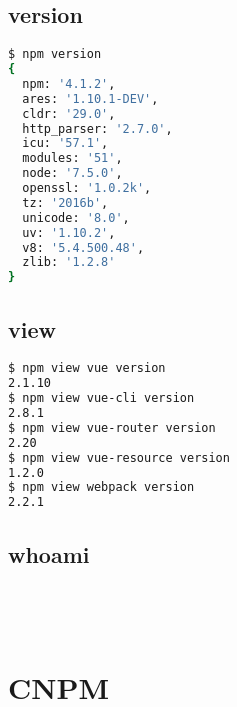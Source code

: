 \subsection{version}

\begin{lstlisting}[language=bash]
$ npm version
{
  npm: '4.1.2',
  ares: '1.10.1-DEV',
  cldr: '29.0',
  http_parser: '2.7.0',
  icu: '57.1',
  modules: '51',
  node: '7.5.0',
  openssl: '1.0.2k',
  tz: '2016b',
  unicode: '8.0',
  uv: '1.10.2',
  v8: '5.4.500.48',
  zlib: '1.2.8' 
}
\end{lstlisting}

\subsection{view}


\begin{lstlisting}[language=bash]
$ npm view vue version
2.1.10
$ npm view vue-cli version
2.8.1
$ npm view vue-router version
2.20
$ npm view vue-resource version
1.2.0
$ npm view webpack version
2.2.1
\end{lstlisting}

\subsection{whoami}



\begin{lstlisting}[language=bash]

\end{lstlisting}




\begin{lstlisting}[language=bash]

\end{lstlisting}




\begin{lstlisting}[language=bash]

\end{lstlisting}




\begin{lstlisting}[language=bash]

\end{lstlisting}



\section{CNPM}

